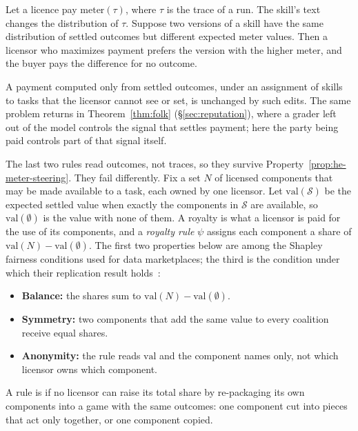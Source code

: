 \begin{property}\label{prop:he-meter-steering}
\setlength{\parskip}{4pt plus 1pt}
Let a licence pay $\mathrm{meter}(\tau)$, where $\tau$ is the trace of a run. The skill's
text changes the distribution of $\tau$. Suppose two versions of a skill have
the same distribution of settled outcomes but different expected meter
values. Then a licensor who maximizes payment prefers the version with the
higher meter, and the buyer pays the difference for no outcome.

A payment computed only from settled outcomes, under an assignment of skills
to tasks that the licensor cannot see or set, is unchanged by such edits.
The same problem returns in Theorem~\ref{thm:folk}
(\S\ref{sec:reputation}), where a grader left out of the model controls the
signal that settles payment; here the party being paid controls part of that
signal itself.
\end{property}

The last two rules read outcomes, not traces, so they survive
Property~\ref{prop:he-meter-steering}. They fail differently. Fix a set $N$
of licensed components that may be made available to a task, each owned by
one licensor. Let $\mathrm{val}(\mathcal S)$ be the expected settled value when exactly the
components in $\mathcal S$ are available, so $\mathrm{val}(\emptyset)$ is the value with none
of them. A royalty is what a licensor is paid for the use of its
components, and a \emph{royalty rule} $\psi$ assigns each component a share of
$\mathrm{val}(N)-\mathrm{val}(\emptyset)$. The first two properties below are among the Shapley
fairness conditions used for data marketplaces; the third is the condition
under which their replication result holds~:
\begin{itemize}[leftmargin=1.4em,itemsep=1pt]
  \item \textbf{Balance:} the shares sum to $\mathrm{val}(N)-\mathrm{val}(\emptyset)$.
  \item \textbf{Symmetry:} two components that add the same value to every
  coalition receive equal shares.
  \item \textbf{Anonymity:} the rule reads $\mathrm{val}$ and the component names only,
  not which licensor owns which component.
\end{itemize}
A rule is  if no licensor can raise its total share by
re-packaging its own components into a game with the same outcomes: one
component cut into pieces that act only together, or one component copied.

